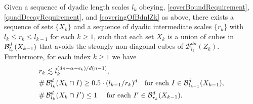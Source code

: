 \begin{lemma} 
	Given a sequence of dyadic length scales $l_k$ obeying, \eqref{coverBoundRequirement}, \eqref{quadDecayRequirement}, and \eqref{coveringOfBdnlZk} as above, there exists a sequence of sets $\{X_k\}$ and a sequence of dyadic intermediate scales $\{ r_k \}$ with $l_k \leq r_k \leq l_{k-1}$ for each $k \geq 1$, such that each set $X_k$ is a union of cubes in $\operatorname{\mathcal{B}}_{l_k}^d(X_{k-1})$ that avoids the strongly non-diagonal cubes of $\mathcal B_{l_k}^{dn}(Z_k)$. Furthermore, for each index $k\geq 1$ we have
	\begin{align}
		& r_k \lesssim l_k^{(dn-\alpha -\epsilon_k)/d(n-1)},\label{rkSizeBound}\\
		& \# \B^d_{l_k}(X_k \cap I) \geq 0.5 \cdot (l_{k-1}/r_k)^d \quad \text{for each}\ I\in \B_{l_{k-1}}^d(X_{k-1}), \label{manyIkInIkm1}\\
		&\# \B^d_{l_k}(X_k \cap I') \leq 1 \quad \text{ for each}\ I' \in \B_{r_{k}}^d(X_{k-1}).\label{XkWellDistributed}
	\end{align}
\end{lemma}
